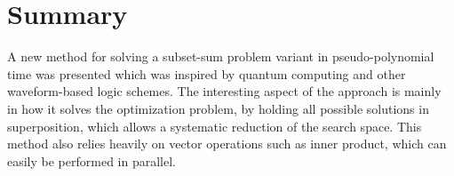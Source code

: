 \documentclass[reqno]{amsart}
\newtheorem{thm}{Theorem}[section]
\theoremstyle{definition}
\theoremstyle{remark}
\begin{document}
\section{Summary}
A new method for solving a subset-sum problem variant in pseudo-polynomial time was presented which was inspired by quantum computing and other waveform-based logic schemes. The interesting aspect of the approach is mainly in how it solves the optimization problem, by holding all possible solutions in superposition, which allows a systematic reduction of the search space. This method also relies heavily on vector operations such as inner product, which can easily be performed in parallel.


















\end{document}
